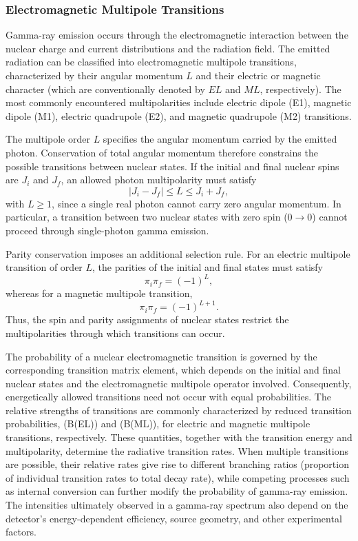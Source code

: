 \subsubsection{Electromagnetic Multipole Transitions}

Gamma-ray emission occurs through the electromagnetic interaction between the nuclear charge and current distributions and the radiation field. The emitted radiation can be classified into electromagnetic multipole transitions, characterized by their angular momentum $L$ and their electric or magnetic character (which are conventionally denoted by $EL$ and $ML$, respectively). The most commonly encountered multipolarities include electric dipole (E1), magnetic dipole (M1), electric quadrupole (E2), and magnetic quadrupole (M2) transitions.

The multipole order $L$ specifies the angular momentum carried by the emitted photon. Conservation of total angular momentum therefore constrains the possible transitions between nuclear states. If the initial and final nuclear spins are $J_i$ and $J_f$, an allowed photon multipolarity must satisfy
\begin{equation}
    |J_i-J_f| \leq L \leq J_i+J_f,
\end{equation}
with $L\geq 1$, since a single real photon cannot carry zero angular momentum. In particular, a transition between two nuclear states with zero spin ($0\rightarrow 0$) cannot proceed through single-photon gamma emission.

Parity conservation imposes an additional selection rule. For an electric multipole transition of order $L$, the parities of the initial and final states must satisfy
\begin{equation}
    \pi_i\pi_f=(-1)^L,
\end{equation}
whereas for a magnetic multipole transition,
\begin{equation}
    \pi_i\pi_f=(-1)^{L+1}.
\end{equation}
Thus, the spin and parity assignments of nuclear states restrict the multipolarities through which transitions can occur.

The probability of a nuclear electromagnetic transition is governed by the corresponding transition matrix element, which depends on the initial and final nuclear states and the electromagnetic multipole operator involved. Consequently, energetically allowed transitions need not occur with equal probabilities. The relative strengths of transitions are commonly characterized by reduced transition probabilities, (B(EL)) and (B(ML)), for electric and magnetic multipole transitions, respectively. These quantities, together with the transition energy and multipolarity, determine the radiative transition rates. When multiple transitions are possible, their relative rates give rise to different branching ratios (proportion of individual transition rates to total decay rate), while competing processes such as internal conversion can further modify the probability of gamma-ray emission. The intensities ultimately observed in a gamma-ray spectrum also depend on the detector's energy-dependent efficiency, source geometry, and other experimental factors.

